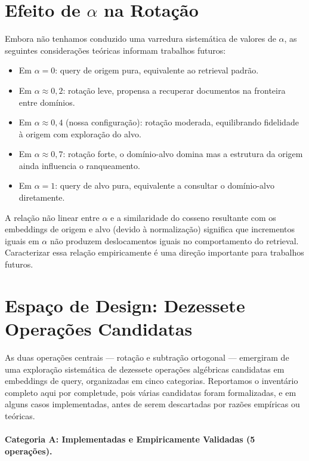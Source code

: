 \documentclass{article}
\begin{document}
\section{Efeito de $\alpha$ na Rotação}

Embora não tenhamos conduzido uma varredura sistemática de valores de $\alpha$, as seguintes considerações teóricas informam trabalhos futuros:

\begin{itemize}
\item Em $\alpha = 0$: query de origem pura, equivalente ao retrieval padrão.
\item Em $\alpha \approx 0{,}2$: rotação leve, propensa a recuperar documentos na fronteira entre domínios.
\item Em $\alpha \approx 0{,}4$ (nossa configuração): rotação moderada, equilibrando fidelidade à origem com exploração do alvo.
\item Em $\alpha \approx 0{,}7$: rotação forte, o domínio-alvo domina mas a estrutura da origem ainda influencia o ranqueamento.
\item Em $\alpha = 1$: query de alvo pura, equivalente a consultar o domínio-alvo diretamente.
\end{itemize}

A relação não linear entre $\alpha$ e a similaridade do cosseno resultante com os embeddings de origem e alvo (devido à normalização) significa que incrementos iguais em $\alpha$ não produzem deslocamentos iguais no comportamento do retrieval. Caracterizar essa relação empiricamente é uma direção importante para trabalhos futuros.

\section{Espaço de Design: Dezessete Operações Candidatas}
\label{app:designspace}

As duas operações centrais --- rotação e subtração ortogonal --- emergiram de uma exploração sistemática de dezessete operações algébricas candidatas em embeddings de query, organizadas em cinco categorias. Reportamos o inventário completo aqui por completude, pois várias candidatas foram formalizadas, e em alguns casos implementadas, antes de serem descartadas por razões empíricas ou teóricas.

\paragraph{Categoria A: Implementadas e Empiricamente Validadas (5 operações).}
\end{document}
